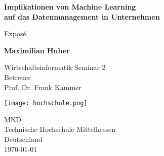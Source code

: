 \begin{titlepage}
   \begin{center}
       \vspace*{1cm}

       \textbf{Implikationen von Machine Learning \\
        auf das Datenmanagement in Unternehmen}

       \vspace{0.5cm}
        Exposé
            
       \vspace{1.5cm}

       \textbf{Maximilian Huber}

       \vfill
            
       Wirtschaftsinformatik Seminar 2\\
       Betreuer\\
       Prof. Dr. Frank Kammer
            
       \vspace{0.8cm}
     
       \texttt{[image: hochschule.png]}
            
       MND\\
       Technische Hochschule Mittelhessen\\
       Deutschland\\
       \today
            
   \end{center}
\end{titlepage}